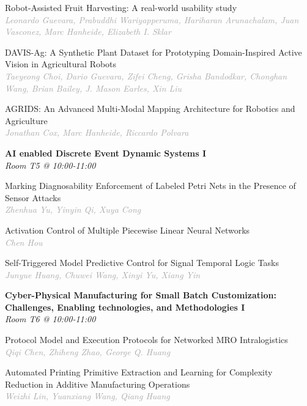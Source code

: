 \begin{multicols*}{2}
\small Robot-Assisted Fruit Harvesting: A real-world usability study\\ 
\footnotesize \textcolor{darkgray}{\textit{Leonardo Guevara, Prabuddhi  Wariyapperuma, Hariharan  Arunachalam, Juan  Vasconez, Marc  Hanheide, Elizabeth I.  Sklar}}

\small DAVIS-Ag: A Synthetic Plant Dataset for Prototyping Domain-Inspired Active Vision in Agricultural Robots\\ 
\footnotesize \textcolor{darkgray}{\textit{Taeyeong Choi, Dario  Guevara, Zifei  Cheng, Grisha  Bandodkar, Chonghan  Wang, Brian  Bailey, J. Mason  Earles, Xin  Liu}}

\small AGRIDS: An Advanced Multi-Modal Mapping Architecture for Robotics and Agriculture\\ 
\footnotesize \textcolor{darkgray}{\textit{Jonathan Cox, Marc  Hanheide, Riccardo  Polvara}}

\normalsize \textbf{AI enabled Discrete Event Dynamic Systems I}\\
\small \textit{Room T5 @ 10:00-11:00}

\small Marking Diagnosability Enforcement of Labeled Petri Nets in the Presence of Sensor Attacks\\ 
\footnotesize \textcolor{darkgray}{\textit{Zhenhua Yu, Yinyin  Qi, Xuya  Cong}}

\small Activation Control of Multiple Piecewise Linear Neural Networks\\ 
\footnotesize \textcolor{darkgray}{\textit{Chen Hou}}

\small Self-Triggered Model Predictive Control for Signal Temporal Logic Tasks\\ 
\footnotesize \textcolor{darkgray}{\textit{Junyue Huang, Chuwei  Wang, Xinyi  Yu, Xiang  Yin}}

\normalsize \textbf{Cyber-Physical Manufacturing for Small Batch Customization: Challenges, Enabling technologies, and Methodologies I}\\
\small \textit{Room T6 @ 10:00-11:00}

\small Protocol Model and Execution Protocols for Networked MRO Intralogistics\\ 
\footnotesize \textcolor{darkgray}{\textit{Qiqi Chen, Zhiheng  Zhao, George Q.  Huang}}

\small Automated Printing Primitive Extraction and Learning for Complexity Reduction in Additive Manufacturing Operations\\ 
\footnotesize \textcolor{darkgray}{\textit{Weizhi Lin, Yuanxiang  Wang, Qiang  Huang}}


\end{multicols*}
